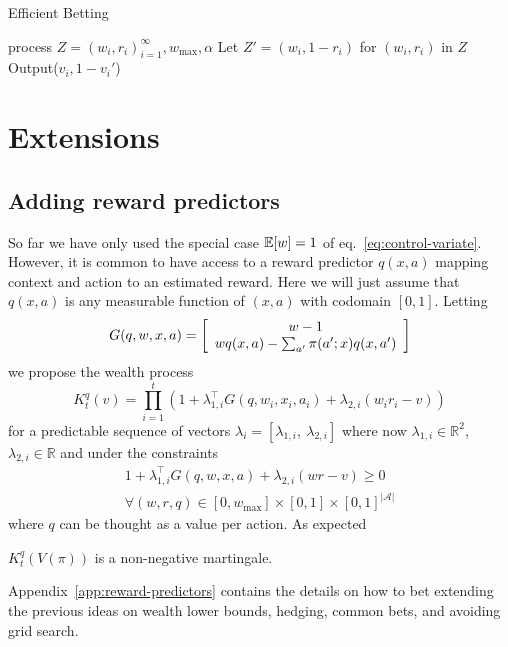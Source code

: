 \begin{algorithm}[tb]
   \caption{Efficient Betting}
   \label{alg:main}
\begin{algorithmic}
     process $Z=(w_i,r_i)_{i=1}^\infty, w_{\max}, \alpha$
    \STATE Let $Z' = (w_i,1-r_i)$ for $(w_i,r_i)$ in $Z$
        \STATE Output($v_i,1-v_i'$)
   \ENDFOR
{}
\ENDFUNCTION
\end{algorithmic}
\end{algorithm}

\section{Extensions}

\subsection{Adding reward predictors}
So far we have only used the special case $\mathbb{E}[w]=1$ 
of eq.~\eqref{eq:control-variate}. However, it is 
common to have access to a reward predictor
$q(x,a)$ mapping context and action to an 
estimated reward. Here we will just assume 
that $q(x,a)$ is any measurable 
function of $(x,a)$ with codomain $[0,1]$. Letting
\[
G(q,w,x,a)=\left[\begin{array}{c} w-1 \\ wq(x,a)-\sum_{a'}\pi(a';x)q(x,a') \end{array}\right]
\]
we propose the wealth process
\[
K_t^q(v)=\prod_{i=1}^{t}\left(1+\lambda_{1,i}^\top G(q,w_i,x_i,a_i)+\lambda_{2,i}(w_ir_i-v)\right)
\]
for a predictable sequence of vectors 
$\lambda_{i}=[\lambda_{1,i},\ \lambda_{2,i}]$ 
where now $\lambda_{1,i} \in \mathbb{R}^{2}$,
$\lambda_{2,i} \in \mathbb{R}$ and 
under the constraints 
\begin{align*}
1+\lambda_{1,i}^\top G(q,w,x,a)+\lambda_{2,i}(wr-v) \geq 0 \\
\forall (w,r,q) \in [0, w_{\max}] \times [0,1] \times [0,1]^{|\mathcal{A}|}
\end{align*}
where $q$ can be thought as a value per action. As expected
\begin{theorem}
$K_t^q(V(\pi))$ is a non-negative martingale.
\end{theorem}
Appendix~\ref{app:reward-predictors} contains the details
on how to bet extending the previous ideas on wealth lower
bounds, hedging, common bets, and avoiding grid search.

